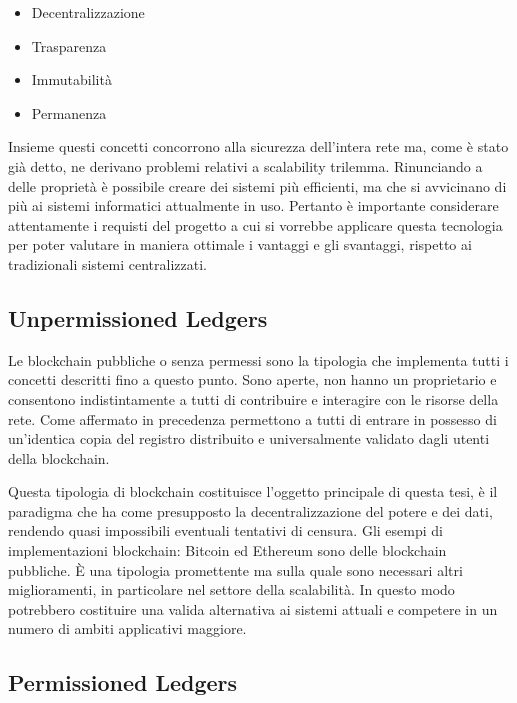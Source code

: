\begin{itemize}
\item Decentralizzazione
\item Trasparenza
\item Immutabilità
\item Permanenza
\end{itemize}

Insieme questi concetti concorrono alla sicurezza dell'intera rete ma, come è stato già detto, ne derivano problemi relativi a scalability trilemma. Rinunciando a delle proprietà è possibile creare dei sistemi più efficienti, ma che si avvicinano di più ai sistemi informatici attualmente in uso. Pertanto è importante considerare attentamente i requisti del progetto a cui si vorrebbe applicare questa tecnologia per poter valutare in maniera ottimale i vantaggi e gli svantaggi, rispetto ai tradizionali sistemi centralizzati.

\subsection{Unpermissioned Ledgers}

Le blockchain pubbliche o senza permessi sono la tipologia che implementa tutti i concetti descritti fino a questo punto. Sono aperte, non hanno un proprietario e consentono indistintamente a tutti di contribuire e interagire con le risorse della rete. Come affermato in precedenza permettono a tutti di entrare in possesso di un’identica copia del  registro distribuito e universalmente validato dagli utenti della blockchain.

Questa tipologia di blockchain costituisce l’oggetto principale di questa tesi, è il paradigma che ha come presupposto la decentralizzazione del potere e dei dati, rendendo quasi impossibili eventuali tentativi di censura. Gli esempi di implementazioni blockchain: Bitcoin ed Ethereum sono delle blockchain pubbliche. È una tipologia promettente ma sulla quale sono necessari altri miglioramenti, in particolare nel settore della scalabilità. In questo modo potrebbero costituire una valida alternativa ai sistemi attuali e competere in un numero di ambiti applicativi maggiore.

\subsection{Permissioned Ledgers}

